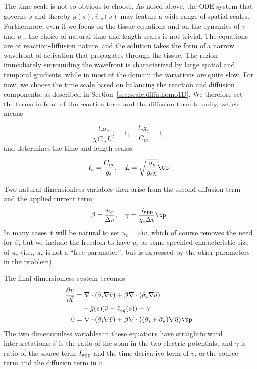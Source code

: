 \documentclass[graybox,envcountchap,sectrefs,final]{svmonodo}
\begin{document}
The time scale is not so obvious to choose. As noted above, the ODE
system that governs $s$ and thereby $\bar g(s), \bar v_{eq} (s)$ may
feature a wide range of spatial scales. Furthermore, even if we focus
on the tissue equations and on the dynamics of $v$ and $u_e$, the
choice of natural time and length scales is not trivial. 
The equations are of reaction-diffusion nature, and the
solution takes the form of a narrow wavefront of activation that
propagates through the tissue. The region immediately surrounding
the wavefront is characterized by large spatial and temporal
gradients, while in most of the
domain the variations are quite slow. For now, we choose the time scale
based on balancing the reaction and diffusion components, as described
in Section~\ref{sec:scale:diffu:homo1D}.  We therefore
set the terms in front of the reaction term and the diffusion term to
unity, which means

\[ \frac{t_c\sigma_c}{\chi C_mL^2} = 1,\quad \frac{t_cg_c}{C_m} =1,\]
and determines the time and length scales:

\[ t_c = \frac{C_m}{g_c},\quad L = \sqrt{\frac{\sigma_c}{g_c \chi}}\tp\]

Two natural dimensionless variables then arise from the second diffusion
term and the applied current term:
\[ \beta = \frac{u_c}{\Delta v}, \quad \gamma =
\frac{I_{\rm{app}}}{g_c \Delta v} \tp\]
In many cases it will be natural to set $u_c=\Delta v$, which of
course removes the need for $\beta$, but we
include the freedom to have $u_c$ as
some specified characteristic size of $u_e$ (i.e., $u_c$ is not a
``free parameter'', but is expressed by the other parameters in the
problem).

The final dimensionless system becomes
\begin{align}
\frac{\partial \bar v}{\partial \bar t} &=
\nabla\cdot( \bar \sigma_i\bar\nabla\bar v) +
\beta\nabla\cdot (\bar \sigma_i\bar \nabla \bar u) \\ 
& \quad -\bar g (s)(\bar v-\bar v_{eq}(s))
- \gamma
\\ 
0 &= \bar \nabla\cdot( \bar \sigma_i\bar \nabla \bar v) +
\beta\nabla\cdot ((\bar \sigma_i + \bar \sigma_e)\bar \nabla \bar u) \tp
\end{align}
The two dimensionless variables in these equations have
straightforward
interpretations: $\beta$ is the ratio of the span in the two electric
potentials, and $\gamma$ is ratio of the source term $I_{\rm{app}}$ and the
time-derivative term of $v$, or the source term and the diffusion term
in $v$.
\end{document}
